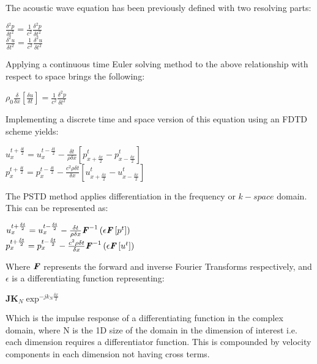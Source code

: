 The acoustic wave equation has been previously defined with two resolving parts:\\
\begin{center}
$\frac{\delta^2 p}{\delta t^2} = \frac{1}{c^2} \frac{\delta^2 p}{\delta t^2}$\\
$\frac{\delta^2 u}{\delta t^2} = \frac{1}{c^2} \frac{\delta^2 u}{\delta t^2}$\\
\end{center}
Applying a continuous time Euler solving method to the above relationship with respect to space brings the following:\\
\begin{center}
$\rho_0 \frac{\delta}{\delta x}\left[\frac{\delta u}{\delta t}\right] =\frac{1}{c^2} \frac{\delta ^2 p}{\delta t^2} $\\
\end{center}
Implementing a discrete time and space version of this equation using an FDTD scheme yields:\\
\begin{center}
$u^{t + \frac{\delta t}{2}}_{x} = u^{t - \frac{\delta t}{2}}_{x} - \frac{\delta t}{\rho \delta x} \left[p^{t}_{x + \frac{\delta x}{2}} - p^{t}_{x - \frac{\delta x}{2}}\right]$\\
$p^{t + \frac{\delta t}{2}}_{x} = p^{t - \frac{\delta t}{2}}_{x} - \frac{c^2 \rho \delta t}{\delta x} \left[u^{t}_{x + \frac{\delta x}{2}} - u^{t}_{x - \frac{\delta x}{2}}\right]$\\
\end{center}
The PSTD method applies differentiation in the frequency or $k-space$ domain. This can be represented as:\\
\begin{center}
$u^{t + \frac{\delta t}{2}}_{x} = u^{t - \frac{\delta t}{2}}_{x} - \frac{\delta t}{\rho \delta x} \textbf{\textit{F}}^{-1}\left(\epsilon \textbf{\textit{F}}\left[p^{t}\right] \right)$\\
$p^{t + \frac{\delta t}{2}}_{x} = p^{t - \frac{\delta t}{2}}_{x} - \frac{c^2 \rho \delta t}{\delta x} \textbf{\textit{F}}^{-1}\left( \epsilon \textbf{\textit{F}} \left[ u^{t} \right] \right)$\\
\end{center}
Where $\textbf{\textit{F}}$ represents the forward and inverse Fourier Transforms respectively, and $\epsilon$ is a differentiating function representing:\\
\begin{center}
$\textbf{JK}_N \exp^{-jk_N\frac{\delta x}{2}}$\\
\end{center}
Which is the impulse response of a differentiating function in the complex domain, where N is the 1D size of the domain in the dimension of interest i.e. each dimension requires a differentiator function. This is compounded by velocity components in each dimension not having cross terms.

